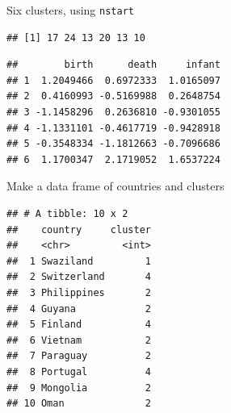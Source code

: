 \documentclass[
  ignorenonframetext,
]{beamer}
\newenvironment{Shaded}{\begin{snugshade}}{\end{snugshade}}
\newcommand{\DataTypeTok}[1]{\textcolor[rgb]{0.13,0.29,0.53}{#1}}
\newcommand{\DecValTok}[1]{\textcolor[rgb]{0.00,0.00,0.81}{#1}}
\newcommand{\FloatTok}[1]{\textcolor[rgb]{0.00,0.00,0.81}{#1}}
\newcommand{\KeywordTok}[1]{\textcolor[rgb]{0.13,0.29,0.53}{\textbf{#1}}}
\newcommand{\NormalTok}[1]{#1}
\newcommand{\OperatorTok}[1]{\textcolor[rgb]{0.81,0.36,0.00}{\textbf{#1}}}
\newcommand{\StringTok}[1]{\textcolor[rgb]{0.31,0.60,0.02}{#1}}
\begin{document}
\begin{frame}[fragile]{Six clusters, using \texttt{nstart}}
\protect\hypertarget{six-clusters-using-nstart}{}

\begin{Shaded}
\end{Shaded}

\begin{verbatim}
## [1] 17 24 13 20 13 10
\end{verbatim}

\begin{Shaded}
\end{Shaded}

\begin{verbatim}
##        birth      death     infant
## 1  1.2049466  0.6972333  1.0165097
## 2  0.4160993 -0.5169988  0.2648754
## 3 -1.1458296  0.2636810 -0.9301055
## 4 -1.1331101 -0.4617719 -0.9428918
## 5 -0.3548334 -1.1812663 -0.7096686
## 6  1.1700347  2.1719052  1.6537224
\end{verbatim}

\end{frame}

\begin{frame}[fragile]{Make a data frame of countries and clusters}
\protect\hypertarget{make-a-data-frame-of-countries-and-clusters}{}

\begin{Shaded}
\end{Shaded}

\begin{verbatim}
## # A tibble: 10 x 2
##    country     cluster
##    <chr>         <int>
##  1 Swaziland         1
##  2 Switzerland       4
##  3 Philippines       2
##  4 Guyana            2
##  5 Finland           4
##  6 Vietnam           2
##  7 Paraguay          2
##  8 Portugal          4
##  9 Mongolia          2
## 10 Oman              2
\end{verbatim}

\end{frame}
\end{document}
